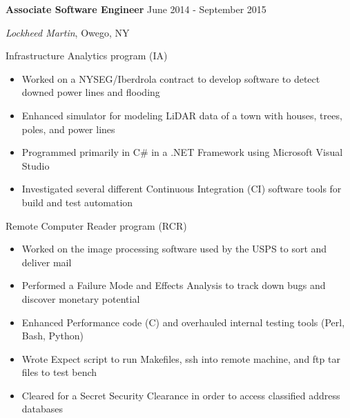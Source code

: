 
\vspace{5pt}

\textbf{Associate Software Engineer} \hfill June 2014 - September 2015

\textit{Lockheed Martin}, Owego, NY

\vspace{3pt}

Infrastructure Analytics program (IA)

\begin{itemize}
    \item Worked on a NYSEG/Iberdrola contract to develop software to detect downed power lines and flooding
    \item Enhanced simulator for modeling LiDAR data of a town with houses, trees, poles, and power lines
    \item Programmed primarily in C\# in a .NET Framework using Microsoft Visual Studio
    \item Investigated several different Continuous Integration (CI) software tools for build and test automation
\end{itemize}

\vspace{3pt}

Remote Computer Reader program (RCR)

\begin{itemize}
    \item Worked on the image processing software used by the USPS to sort and deliver mail
    \item Performed a Failure Mode and Effects Analysis to track down bugs and discover monetary potential
    \item Enhanced Performance code (C) and overhauled internal testing tools (Perl, Bash, Python)
    \item Wrote Expect script to run Makefiles, ssh into remote machine, and ftp tar files to test bench
    \item Cleared for a Secret Security Clearance in order to access classified address databases
\end{itemize}
